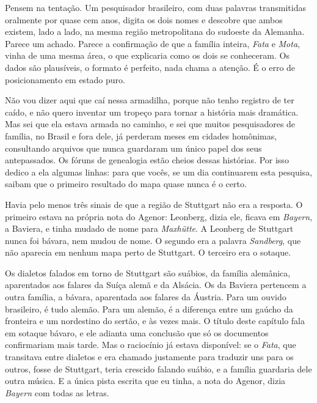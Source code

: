 \documentclass[
  brazilian,
  11pt,
  openany]{book}
\begin{document}
Pensem na tentação. Um pesquisador brasileiro, com duas palavras
transmitidas oralmente por quase cem anos, digita os dois nomes e
descobre que ambos existem, lado a lado, na mesma região metropolitana
do sudoeste da Alemanha. Parece um achado. Parece a confirmação de que a
família inteira, \emph{Fata} e \emph{Mota}, vinha de uma mesma área, o
que explicaria como os dois se conheceram. Os dados são plausíveis, o
formato é perfeito, nada chama a atenção. É o erro de posicionamento em
estado puro.

Não vou dizer aqui que caí nessa armadilha, porque não tenho registro de
ter caído, e não quero inventar um tropeço para tornar a história mais
dramática. Mas sei que ela estava armada no caminho, e sei que muitos
pesquisadores de família, no Brasil e fora dele, já perderam meses em
cidades homônimas, consultando arquivos que nunca guardaram um único
papel dos seus antepassados. Os fóruns de genealogia estão cheios dessas
histórias. Por isso dedico a ela algumas linhas: para que vocês, se um
dia continuarem esta pesquisa, saibam que o primeiro resultado do mapa
quase nunca é o certo.

Havia pelo menos três sinais de que a região de Stuttgart não era a
resposta. O primeiro estava na própria nota do Agenor: Leonberg, dizia
ele, ficava em \emph{Bayern}, a Baviera, e tinha mudado de nome para
\emph{Maxhütte}. A Leonberg de Stuttgart nunca foi bávara, nem mudou de
nome. O segundo era a palavra \emph{Sandberg}, que não aparecia em
nenhum mapa perto de Stuttgart. O terceiro era o sotaque.

Os dialetos falados em torno de Stuttgart são suábios, da família
alemânica, aparentados aos falares da Suíça alemã e da Alsácia. Os da
Baviera pertencem a outra família, a bávara, aparentada aos falares da
Áustria. Para um ouvido brasileiro, é tudo alemão. Para um alemão, é a
diferença entre um gaúcho da fronteira e um nordestino do sertão, e às
vezes mais. O título deste capítulo fala em sotaque bávaro, e ele
adianta uma conclusão que só os documentos confirmariam mais tarde. Mas
o raciocínio já estava disponível: se o \emph{Fata}, que transitava
entre dialetos e era chamado justamente para traduzir uns para os
outros, fosse de Stuttgart, teria crescido falando suábio, e a família
guardaria dele outra música. E a única pista escrita que eu tinha, a
nota do Agenor, dizia \emph{Bayern} com todas as letras.
\end{document}

